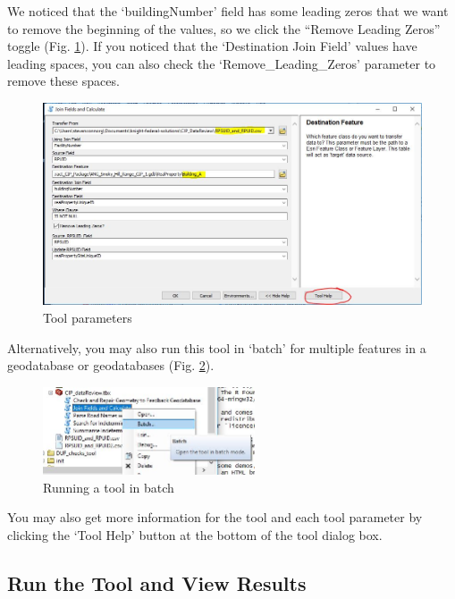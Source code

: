 \documentclass[openany]{book}
\theoremstyle{definition}
\theoremstyle{definition}
\theoremstyle{definition}
\theoremstyle{remark}
\begin{document}
We noticed that the `buildingNumber' field has some leading zeros that
we want to remove the beginning of the values, so we click the ``Remove
Leading Zeros'' toggle (Fig. \ref{fig:jcparams}). If you noticed that
the `Destination Join Field' values have leading spaces, you can also
check the `Remove\_Leading\_Zeros' parameter to remove these spaces.

\begin{figure}[H]

{\centering \includegraphics[width=5.18in,]{figures/joinCalc-toolparams} 

}

\caption{Tool parameters}\label{fig:jcparams}
\end{figure}

Alternatively, you may also run this tool in `batch' for multiple
features in a geodatabase or geodatabases (Fig. \ref{fig:batch}).

\begin{figure}[H]

{\centering \includegraphics[width=2.47in,]{figures/joinCalc-batch} 

}

\caption{Running a tool in batch}\label{fig:batch}
\end{figure}

You may also get more information for the tool and each tool parameter
by clicking the `Tool Help' button at the bottom of the tool dialog box.

\subsection{Run the Tool and View
Results}\label{run-the-tool-and-view-results-1}
\end{document}
